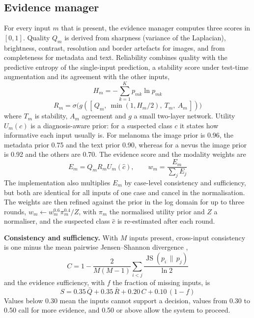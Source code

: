 \documentclass[conference]{IEEEtran}
\DeclareMathOperator{\JS}{JS}
\begin{document}
\subsection{Evidence manager}
For every input $m$ that is present, the evidence manager computes three scores in $[0,1]$. Quality $Q_m$ is derived from sharpness (variance of the Laplacian), brightness, contrast, resolution and border artefacts for images, and from completeness for metadata and text. Reliability combines quality with the predictive entropy of the single-input prediction, a stability score under test-time augmentation and its agreement with the other inputs,
\begin{equation}
H_m=-\sum_{k=1}^{K}p_{mk}\ln p_{mk}
\label{eq:H}
\end{equation}
\begin{equation}
R_m=\sigma\!\bigl(g([\,Q_m,\ \min(1,H_m/2),\ T_m,\ A_m\,])\bigr)
\label{eq:R}
\end{equation}
where $T_m$ is stability, $A_m$ agreement and $g$ a small two-layer network. Utility $U_m(c)$ is a diagnosis-aware prior: for a suspected class $c$ it states how informative each input usually is. For melanoma the image prior is 0.96, the metadata prior 0.75 and the text prior 0.90, whereas for a nevus the image prior is 0.92 and the others are 0.70. The evidence score and the modality weights are
\begin{equation}
E_m=Q_mR_mU_m(\hat c),\qquad w_m=\frac{E_m}{\sum_j E_j}
\label{eq:E}
\end{equation}
The implementation also multiplies $E_m$ by case-level consistency and sufficiency, but both are identical for all inputs of one case and cancel in the normalisation. The weights are then refined against the prior in the log domain for up to three rounds, $w_m\leftarrow w_m^{0.6}\pi_m^{0.4}/Z$, with $\pi_m$ the normalised utility prior and $Z$ a normaliser, and the suspected class $\hat c$ is re-estimated after each round.

\textbf{Consistency and sufficiency.} With $M$ inputs present, cross-input consistency is one minus the mean pairwise Jensen--Shannon divergence \cite{lin1991},
\begin{equation}
C=1-\frac{2}{M(M-1)}\sum_{i<j}\frac{\JS(p_i\,\|\,p_j)}{\ln 2}
\label{eq:C}
\end{equation}
and the evidence sufficiency, with $f$ the fraction of missing inputs, is
\begin{equation}
S=0.35\,\bar Q+0.35\,\bar R+0.20\,C+0.10\,(1-f)
\label{eq:S}
\end{equation}
Values below 0.30 mean the inputs cannot support a decision, values from 0.30 to 0.50 call for more evidence, and 0.50 or above allow the system to proceed.
\end{document}
